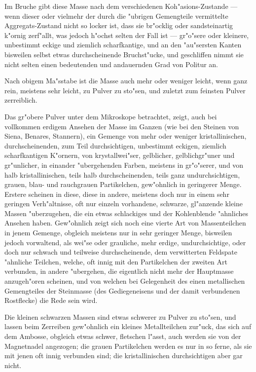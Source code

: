 \documentclass[a4paper, 11pt, oneside, german]{article}
\begin{document}
Im Bruche gibt diese Masse nach dem verschiedenen Koh"asions-Zustande --- wenn dieser oder vielmehr der durch die "ubrigen Gemengteile vermittelte Aggregats-Zustand nicht so locker ist, dass sie br"ocklig oder sandsteinartig k"ornig zerf"allt, was jedoch h"ochst selten der Fall ist --- gr"o"sere oder kleinere, unbestimmt eckige und ziemlich scharfkantige, und an den "au"sersten Kanten bisweilen selbst etwas durchscheinende Bruchst"ucke, und geschliffen nimmt sie nicht selten einen bedeutenden und andauernden Grad von Politur an.

Nach obigem Ma"sstabe ist die Masse auch mehr oder weniger leicht, wenn ganz rein, meistens sehr leicht, zu Pulver zu sto"sen, und zuletzt zum feinsten Pulver zerreiblich.

Das gr"obere Pulver unter dem Mikroskope betrachtet, zeigt, auch bei vollkommen erdigem Ansehen der Masse im Ganzen (wie bei den Steinen von Siena, Benares, Stannern), ein Gemenge von mehr oder weniger kristallinischen, durchscheinenden, zum Teil durchsichtigen, unbestimmt eckigen, ziemlich scharfkantigen K"ornern, von krystallwei"ser, gelblicher, gelblichgr"uner und gr"unlicher, in einander "ubergehenden Farben, meistens in gr"o"serer, und von halb kristallinischen, teils halb durchscheinenden, teils ganz undurchsichtigen, grauen, blau- und rauchgrauen Partikelchen, gew"ohnlich in geringerer Menge. Erstere scheinen in diese, diese in andere, meistens doch nur in einem sehr geringen Verh"altnisse, oft nur einzeln vorhandene, schwarze, gl"anzende kleine Massen "uberzugehen, die ein etwas schlackiges und der Kohlenblende "ahnliches Ansehen haben. Gew"ohnlich zeigt sich noch eine vierte Art von Massenteilchen in jenem Gemenge, obgleich meistens nur in sehr geringer Menge, bisweilen jedoch vorwaltend, als wei"se oder grauliche, mehr erdige, undurchsichtige, oder doch nur schwach und teilweise durchscheinende, dem verwitterten Feldspate "ahnliche Teilchen, welche, oft innig mit den Partikelchen der zweiten Art verbunden, in andere "ubergehen, die eigentlich nicht mehr der Hauptmasse anzugeh"oren scheinen, und von welchen bei Gelegenheit des einen metallischen Gemengteiles der Steinmasse (des Gediegeneisens und der damit verbundenen Rostflecke) die Rede sein wird.

Die kleinen schwarzen Massen sind etwas schwerer zu Pulver zu sto"sen, und lassen beim Zerreiben gew"ohnlich ein kleines Metallteilchen zur"uck, das sich auf dem Ambosse, obgleich etwas schwer, fletschen l"asst, auch werden sie von der Magnetnadel angezogen; die grauen Partikelchen werden es nur in so ferne, als sie mit jenen oft innig verbunden sind; die kristallinischen durchsichtigen aber gar nicht.
\end{document}
